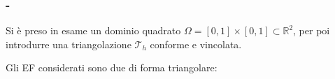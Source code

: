 \documentclass[11pt]{beamer}
\begin{document}
            \begin{frame}\frametitle{\insertpart{} - \insertsection{}}
    
                Si è preso in esame un dominio quadrato $\Omega=[0,1]\times[0,1] \subset\mathbb R^2$, per poi introdurre una triangolazione $\mathcal T_h$ conforme e vincolata. 
            
                Gli EF considerati sono due di forma triangolare:
            
                \begin{itemize}[label=$\diamond$,   %
                                itemsep=0pt,        %
                                leftmargin=10pt]    %
                

\end{itemize}
\end{frame}
\end{document}
